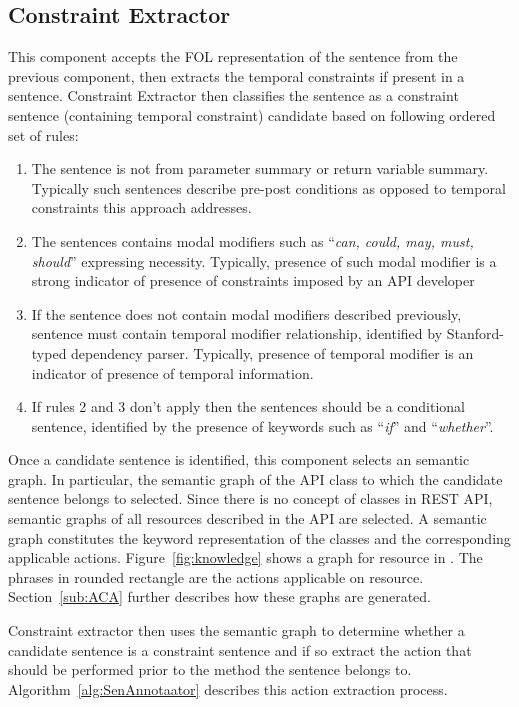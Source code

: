 \subsection{Constraint Extractor}
\label{sub:SE}

This component accepts the FOL representation of the sentence from the previous component,
then extracts the temporal constraints if present in a sentence.
Constraint Extractor then classifies the sentence as a constraint 
sentence (containing temporal constraint) candidate based on following ordered set of rules:

\begin{enumerate}
	\item The sentence is not from parameter summary or return variable summary.
	Typically such sentences describe pre-post conditions as opposed to temporal constraints this approach addresses.
	\item The sentences contains modal modifiers such as ``\textit{can, could, may, must, should}'' expressing necessity.
	Typically, presence of such modal modifier is a strong indicator of presence of constraints imposed by an API developer
	\item If the sentence does not contain modal modifiers described previously, sentence must contain temporal modifier relationship, identified by Stanford-typed dependency parser.
	Typically, presence of temporal modifier is an indicator of presence of temporal information.  
	\item If rules 2 and 3 don't apply then the sentences should be a conditional sentence, identified by the presence of keywords such as ``\textit{if}'' and ``\textit{whether}''.
\end{enumerate} 

Once a candidate sentence is identified, this component selects an semantic graph.
In particular, the semantic graph of the API class to which the candidate sentence belongs to selected.
Since there is no concept of classes in REST API, semantic graphs of all resources described in the API are selected.
A semantic graph constitutes the keyword representation of the classes and the corresponding applicable actions. 
Figure~\ref{fig:knowledge} shows a graph for  resource in \amazonAPI.
The phrases in rounded rectangle are the actions applicable on  resource.
Section~\ref{sub:ACA} further describes how these graphs are generated.

 
Constraint extractor then uses the semantic graph to determine
whether a candidate sentence is a constraint sentence and if so extract
the action that should be performed prior to the method the sentence
belongs to. Algorithm~\ref{alg:SenAnnotaator} describes this action extraction
process.  

